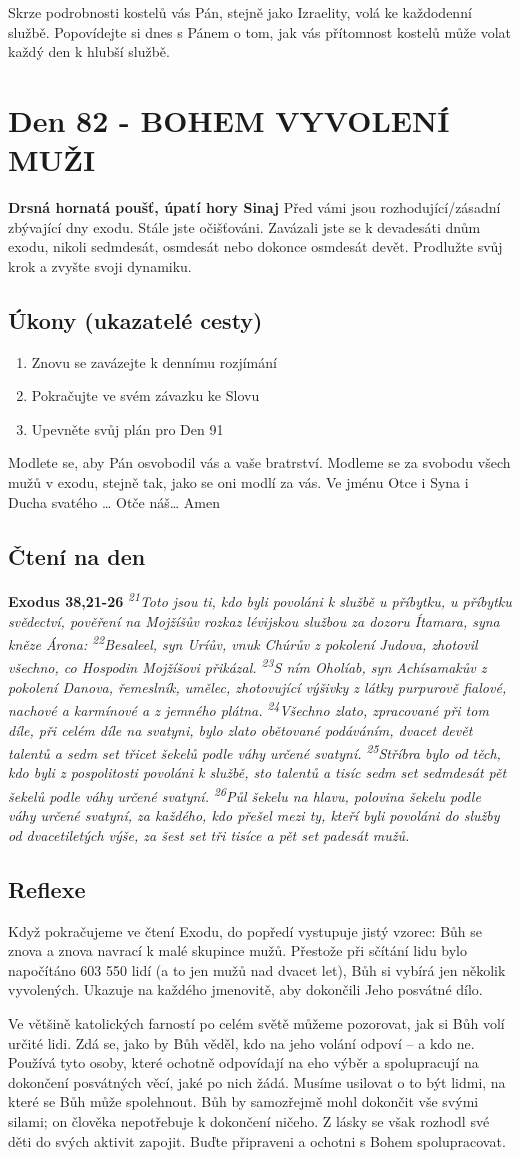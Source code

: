 \documentclass[11pt]{article}
\newcommand{\zacatekDvanactyTyden}{
\textbf{Drsná hornatá poušť, úpatí hory Sinaj} \newline 
Před vámi jsou rozhodující/zásadní zbývající dny exodu. Stále jste očišťováni. Zavázali jste se k devadesáti dnům exodu, nikoli sedmdesát, osmdesát nebo dokonce osmdesát devět. Prodlužte svůj krok a zvyšte svoji dynamiku.

\subsection*{Úkony (ukazatelé cesty)}
\begin{enumerate}
  \item Znovu se zavázejte k dennímu rozjímání
  \item Pokračujte ve svém závazku ke Slovu
  \item Upevněte svůj plán pro Den 91
\end{enumerate}
Modlete se, aby Pán osvobodil vás a vaše bratrství. \newline
Modleme se za svobodu všech mužů v exodu, stejně tak, jako se oni modlí za vás.\newline
Ve jménu Otce i Syna i Ducha svatého …  Otče náš… Amen
}
\begin{document}
Skrze podrobnosti kostelů vás Pán, stejně jako Izraelity, volá ke každodenní službě. Popovídejte si dnes s Pánem o tom, jak vás
přítomnost kostelů může volat každý den k hlubší službě.


\newpage
\section{Den 82 - BOHEM VYVOLENÍ MUŽI}
\zacatekDvanactyTyden
\subsection*{Čtení na den}
\textbf{Exodus 38,21-26}
\newline
\textit{
\textsuperscript{21}Toto jsou ti, kdo byli povoláni k službě u příbytku, u příbytku svědectví, pověření na Mojžíšův rozkaz lévijskou službou za dozoru Ítamara, syna kněze Árona:
\textsuperscript{22}Besaleel, syn Uríův, vnuk Chúrův z pokolení Judova, zhotovil všechno, co Hospodin Mojžíšovi přikázal.
\textsuperscript{23}S ním Oholíab, syn Achísamakův z pokolení Danova, řemeslník, umělec, zhotovující výšivky z látky purpurově fialové, nachové a karmínové a z jemného plátna.
\textsuperscript{24}Všechno zlato, zpracované při tom díle, při celém díle na svatyni, bylo zlato obětované podáváním, dvacet devět talentů a sedm set třicet šekelů podle váhy určené svatyní.
\textsuperscript{25}Stříbra bylo od těch, kdo byli z pospolitosti povoláni k službě, sto talentů a tisíc sedm set sedmdesát pět šekelů podle váhy určené svatyní.
\textsuperscript{26}Půl šekelu na hlavu, polovina šekelu podle váhy určené svatyní, za každého, kdo přešel mezi ty, kteří byli povoláni do služby od dvacetiletých výše, za šest set tři tisíce a pět set padesát mužů.
}

\subsection*{Reflexe}
Když pokračujeme ve čtení Exodu, do popředí vystupuje jistý vzorec: Bůh se znova a znova navrací k malé skupince
mužů. Přestože při sčítání lidu bylo napočítáno 603 550 lidí (a to jen mužů nad dvacet let), Bůh si vybírá jen několik
vyvolených. Ukazuje na každého jmenovitě, aby dokončili Jeho posvátné dílo.

Ve většině katolických farností po celém světě můžeme pozorovat, jak si Bůh volí určité lidi. Zdá se, jako by Bůh
věděl, kdo na jeho volání odpoví – a kdo ne. Používá tyto osoby, které ochotně odpovídají na eho výběr a spolupracují
na dokončení posvátných věcí, jaké po nich žádá. Musíme usilovat o to být lidmi, na které se Bůh může spolehnout.
Bůh by samozřejmě mohl dokončit vše svými silami; on člověka nepotřebuje k dokončení ničeho. Z lásky se však
rozhodl své děti do svých aktivit zapojit. Buďte připraveni a ochotni s Bohem spolupracovat.
\end{document}
